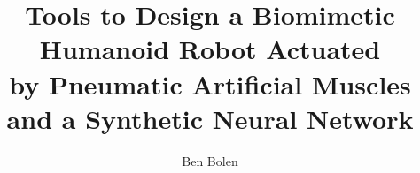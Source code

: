 \documentclass[double,12pt]{psutex}
\title{Tools to Design a Biomimetic Humanoid Robot Actuated\\ by Pneumatic Artificial Muscles and a Synthetic Neural Network} %
\author{Ben Bolen}
\begin{document}
\maketitle









% 

\tableofcontents
\listoftables
\listoffigures

\mainmatter










\appendix
\renewcommand{\theequation}{\thechapter\arabic{equation}}
\renewcommand{\thetable}{\thechapter\arabic{table}}
\renewcommand{\thefigure}{\thechapter\arabic{figure}}



\end{document}
